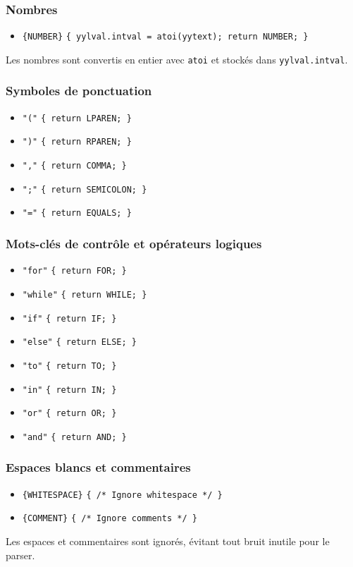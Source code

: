 \documentclass[12pt,a4paper]{article}
\begin{document}
\subsubsection*{Nombres}
\begin{itemize}
    \item \texttt{\{NUMBER\}} \hfill \texttt{\{ yylval.intval = atoi(yytext); return NUMBER; \}}
\end{itemize}
Les nombres sont convertis en entier avec \texttt{atoi} et stockés dans \texttt{yylval.intval}.

\subsubsection*{Symboles de ponctuation}
\begin{itemize}
    \item \texttt{"("} \hfill \texttt{\{ return LPAREN; \}}
    \item \texttt{")"} \hfill \texttt{\{ return RPAREN; \}}
    \item \texttt{","} \hfill \texttt{\{ return COMMA; \}}
    \item \texttt{";"} \hfill \texttt{\{ return SEMICOLON; \}}
    \item \texttt{"="} \hfill \texttt{\{ return EQUALS; \}}
\end{itemize}


\subsubsection*{Mots-clés de contrôle et opérateurs logiques}
\begin{itemize}
    \item \texttt{"for"} \hfill \texttt{\{ return FOR; \}}
    \item \texttt{"while"} \hfill \texttt{\{ return WHILE; \}}
    \item \texttt{"if"} \hfill \texttt{\{ return IF; \}}
    \item \texttt{"else"} \hfill \texttt{\{ return ELSE; \}}
    \item \texttt{"to"} \hfill \texttt{\{ return TO; \}}
    \item \texttt{"in"} \hfill \texttt{\{ return IN; \}}
    \item \texttt{"or"} \hfill \texttt{\{ return OR; \}}
    \item \texttt{"and"} \hfill \texttt{\{ return AND; \}}
\end{itemize}


\subsubsection*{Espaces blancs et commentaires}
\begin{itemize}
    \item \texttt{\{WHITESPACE\}} \hfill \texttt{\{ /* Ignore whitespace */ \}}
    \item \texttt{\{COMMENT\}} \hfill \texttt{\{ /* Ignore comments */ \}}
\end{itemize}
Les espaces et commentaires sont ignorés, évitant tout bruit inutile pour le parser.
\end{document}
